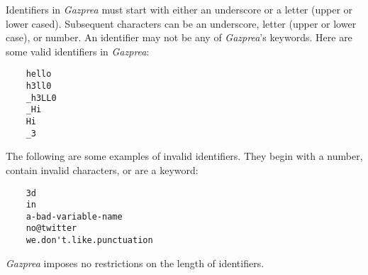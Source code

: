 \documentclass[../gazprea.tex]{subfiles}
\begin{document}
Identifiers in \textit{Gazprea} must start with either an underscore or a letter (upper or lower
cased). Subsequent characters can be an underscore, letter (upper or lower case), or number. An
identifier may not be any of \textit{Gazprea}'s keywords. Here are some valid identifiers in
\textit{Gazprea}:
\begin{lstlisting}
	hello
	h3ll0
	_h3LL0
	_Hi
	Hi
	_3
\end{lstlisting}

The following are some examples of invalid identifiers. They begin with a number, contain invalid
characters, or are a keyword:
\begin{lstlisting}
	3d
	in
	a-bad-variable-name
	no@twitter
	we.don't.like.punctuation
\end{lstlisting}

\textit{Gazprea} imposes no restrictions on the length of identifiers.
\end{document}
